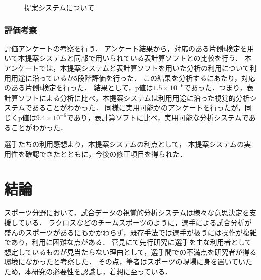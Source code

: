 \documentclass[sotsuron]{kuee}
\begin{document}
			\begin{figure}
				\begin{center}
				\end{center}
				\caption{提案システムについて}
		  		\label{fig:result08}
			\end{figure}
		\subsection{評価考察}
			評価アンケートの考察を行う．
			アンケート結果から，対応のある片側t検定を用いて本提案システムと同部で用いられている表計算ソフトとの比較を行う．
			本アンケートでは，本提案システムと表計算ソフトを用いた分析の利用について利用用途に沿っているか5段階評価を行った．
			この結果を分析するにあたり，対応のある片側t検定を行った．
			結果として，p値は$1.5 \times 10^{-6}$であった．つまり，表計算ソフトによる分析に比べ，本提案システムは利用用途に沿った視覚的分析システムであることがわかった．
			同様に実用可能かのアンケートを行ったが，同じくp値は$9.4 \times 10^{-6}$であり，表計算ソフトに比べ，実用可能な分析システムであることがわかった．

			選手たちの利用感想より，本提案システムの利点として，	
			本提案システムの実用性を確認できたとともに，今後の修正項目を得られた．

\chapter{結論}
	スポーツ分野において，試合データの視覚的分析システムは様々な意思決定を支援している．
	ラクロスなどのチームスポーツのように，選手による試合分析が盛んのスポーツがあるにもかかわらず，既存手法では選手が扱うには操作が複雑であり，利用に困難な点がある．
	管見にて先行研究に選手を主な利用者として想定しているものが見当たらない理由として，選手間での不満点を研究者が得る環境になかったと考察した．
	その点，筆者はスポーツの現場に身を置いていたため，本研究の必要性を認識し，着想に至っている．
\end{document}
